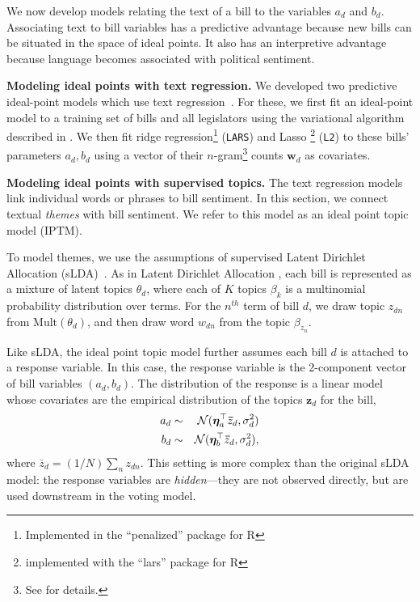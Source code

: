 We now develop models relating the text of a bill to the variables
$a_d$ and $b_d$.  Associating text to bill variables has a predictive
advantage because new bills can be situated in the space of ideal
points.  It also has an interpretive advantage because language
becomes associated with political sentiment.

\textbf{Modeling ideal points with text regression.} We developed two
predictive ideal-point models which use text
regression~\cite{Kogan:2009}.  For these, we first fit an ideal-point
model to a training set of bills and all legislators using the
variational algorithm described in .  We then fit ridge
regression\footnote{Implemented in the ``penalized'' package for R}
(\verb!LARS!) and Lasso
\footnote{implemented with the ``lars'' package for R} (\verb!L2!) to
these bills' parameters $a_d, b_d$ using a vector of their
$n$-gram\footnote{See  for details.}  counts $\bm
w_{d}$ as covariates.

\textbf{Modeling ideal points with supervised topics.} The text
regression models link individual words or phrases to bill sentiment.
In this section, we connect textual \emph{themes} with bill sentiment.
We refer to this model as an ideal point topic model (IPTM).

To model themes, we use the assumptions of supervised Latent Dirichlet
Allocation (sLDA)~\cite{blei:2008}.  As in Latent Dirichlet Allocation
\cite{blei:2003}, each bill is represented as a mixture of latent
topics $\theta_d$, where each of $K$ topics $\beta_k$ is a multinomial
probability distribution over terms.  For the $n^{th}$ term of bill
$d$, we draw topic $z_{dn}$ from $\mbox{Mult}(\theta_d)$, and then
draw word $w_{dn}$ from the topic $\beta_{z_n}$.




Like sLDA, the ideal point topic model further assumes each bill
$d$ is attached to a response variable.  In this case, the
response variable is the 2-component vector of bill variables $(a_d,
b_d)$.  The distribution of the response is a linear model whose
covariates are the empirical distribution of the topics $\bm z_d$ for the
bill,
\begin{eqnarray*}
  a_d &\sim& {\cal N}(\bm \eta_a^\top \bm \bar{z}_d, \sigma_d^2) \nonumber \\
  b_d &\sim& {\cal N}(\bm \eta_b^\top \bm \bar{z}_d, \sigma_d^2), \nonumber \\
\end{eqnarray*}
where $\bar{z}_d = (1/N) \sum_n z_{dn}$.  This setting is more complex
than the original sLDA model: the response variables are
\textit{hidden}---they are not observed directly, but are used
downstream in the voting model.

